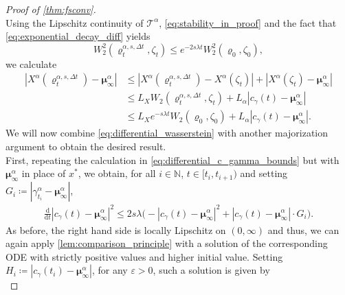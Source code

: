 \documentclass[reqno]{amsart}
\numberwithin{algorithm}{section}
\newcommand{\diff}{\mathrm{d}}
\newcommand{\Xalpha}{{X^\alpha}}
\newcommand{\NN}{{\mathbb N}}
\begin{document}
{\begin{proof}[Proof of \cref{thm:fsconv}]
\begin{equation}
    \end{equation}
    Using the Lipschitz continuity of $\mathcal{T}^\alpha$, \cref{eq:stability_in_proof} and the fact that \cref{eq:exponential_decay_diff} yields
    \begin{equation}\label{73}
        W_2^2(\varrho_{t}^{\alpha,s,\Delta t}, \zeta_t) {\leq} e^{-2s\lambda t} W_2^2(\varrho_0, \zeta_0),
    \end{equation}
    we calculate
    \begin{equation}\label{eq:differential_wasserstein}
        \begin{split}
        |\Xalpha(\varrho_{t}^{\alpha,s,\Delta t}) - \boldsymbol\mu_\infty^\alpha| &\leq |\Xalpha(\varrho_{t}^{\alpha,s,\Delta t}) - \Xalpha(\zeta_t)| + |\Xalpha(\zeta_t) - \boldsymbol\mu_\infty^\alpha| \\
        &\leq L_X W_2(\varrho_{t}^{\alpha,s,\Delta t}, \zeta_t) + L_\alpha |c_\gamma(t) - \boldsymbol\mu_\infty^\alpha| \\
        &\leq L_X e^{-s\lambda t} W_2(\varrho_0, \zeta_0) + L_\alpha |c_\gamma(t) - \boldsymbol\mu_\infty^\alpha|.
        \end{split}
    \end{equation}
    We will now combine \cref{eq:differential_wasserstein} with another majorization argument to obtain the desired result. \\
    First, repeating the calculation in \cref{eq:differential_c_gamma_bounds} but with $\boldsymbol\mu_\infty^\alpha$ in place of $x^*$, we obtain, for all $i \in \NN$, $t \in [t_i, t_{i+1})$ and setting $G_i \coloneqq |\gamma_{t_i}^\alpha - \boldsymbol\mu_\infty^\alpha|$,
    \begin{equation}\label{eq:differential_c_gamma'}
        \begin{split}
            \frac{\diff}{\diff t} |c_\gamma(t) - \boldsymbol\mu_\infty^\alpha|^2 \leq 2 s \lambda \Big( - |c_\gamma(t) - \boldsymbol\mu_\infty^\alpha|^2  + |c_\gamma(t) - \boldsymbol\mu_\infty^\alpha| \cdot G_i \Big).
        \end{split}
    \end{equation}
    As before, the right hand side is locally Lipschitz on $(0, \infty)$ and thus, we can again apply \cref{lem:comparison_principle} with a solution of the corresponding ODE with strictly positive values and higher initial value. Setting $H_i \coloneqq |c_\gamma(t_i) - \boldsymbol\mu_\infty^\alpha|$, for any $\varepsilon > 0$, such a solution is given by
    \begin{equation*}

\end{equation*}
\end{proof}}
\end{document}
